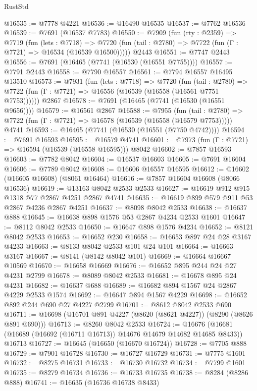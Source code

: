 \begin{lexlean}{RustStd}
\begin{coremodule}
@16535 := @7778 @4221
@16536 := @16490 @16535
@16537 := @7762 @16536
@16539 := @7691 (@16537 @7783)
@16550 := @7909
    (fun (rty : @2359) =>
    @7719
      (fun (lets : @7718) =>
      @7720 (fun (tail : @2780) => @7722 (fun (Γ : @7721) => @16534 (@16539 @16500)))))
    @2443
@16551 := @7747 @2443
@16556 := @7691 (@16465 (@7741 (@16530 (@16551 @7755))))
@16557 := @7791 @2443
@16558 := @7790 @16557
@16561 := @7794 @16557 @16495 @13510
@16573 := @7931
    (fun (lets : @7718) =>
    @7720
      (fun (tail : @2780) =>
      @7722 (fun (Γ : @7721) => @16556 (@16539 (@16558 (@16561 @7751 @7753))))))
    @2867
@16578 := @7691 (@16465 (@7741 (@16530 (@16551 @9656))))
@16579 := @16561 @2867
@16588 := @7955
    (fun (tail : @2780) => @7722 (fun (Γ : @7721) => @16578 (@16539 (@16558 (@16579 @7753)))))
    @4741
@16593 := @16465 (@7741 (@16530 (@16551 (@7750 @4742))))
@16594 := @7691 @16593
@16595 := @16579 @4741
@16601 := @7973 (fun (Γ : @7721) => @16594 (@16539 (@16558 @16595))) @8042
@16602 := @7857 @16593
@16603 := @7782 @8042
@16604 := @16537 @16603
@16605 := @7691 @16604
@16606 := @7789 @8042
@16608 := @16606 @16557 @16595
@16612 := @16602 (@16605 @16608) (@8061 @16464)
@16616 := @7857 @16604 @16608 (@8066 @16536)
@16619 := @13163 @8042 @2533 @2533
@16627 := @16619 @912 @915 @1318 @77 @2867 @4251 @2867 @4741
@16635 := @16619 @899 @579 @911 @53 @2867 @4236 @2867 @4251
@16637 := @8098 @8042 @2533
@16638 := @16637 @888
@16645 := @16638 @898 @1576 @53 @2867 @4234 @2533 @1601
@16647 := @8112 @8042 @2533
@16650 := @16647 @898 @1576 @4234
@16652 := @8121 @8042 @2533
@16653 := @16652 @230
@16658 := @16653 @897 @24 @28 @3167 @4233
@16663 := @8133 @8042 @2533 @101 @24 @101
@16664 := @16663 @3167
@16667 := @8141 (@8142 @8042 @101)
@16669 := @16664 @16667 @10569
@16670 := @16658 @16669
@16676 := @16652 @895 @244 @24 @27 @4231 @2799
@16678 := @8089 @8042 @2533
@16681 := @16678 @895 @24 @4231
@16682 := @16637 @688
@16689 := @16682 @894 @1567 @24 @2867 @4229 @2533 @1574
@16692 := @16647 @894 @1567 @4229
@16698 := @16652 @892 @244 @690 @27 @4227 @2799
@16701 := @8612 @8042 @2533 @690
@16711 := @16698 (@16701 @891 @4227 (@8620 (@8621 @4227)) (@8290 (@8626 @891 @690)))
@16713 := @8260 @8042 @2533
@16724 := @16676 (@16681 (@16689 (@16692 (@16711 @16713)) @14676 @14679 @14682 @14685 @8433)) @16713
@16727 := @16645 (@16650 (@16670 @16724))
@16728 := @7705 @888
@16729 := @7901 @16728
@16730 := @16727 @16729
@16731 := @7775 @1601
@16732 := @8275 @16731
@16733 := @16730 @16732
@16734 := @7799 @1601
@16735 := @8279 @16734
@16736 := @16733 @16735
@16738 := @8284 (@8286 @888)
@16741 := @16635 (@16736 @16738 @8433)

\end{coremodule}
\end{lexlean}
